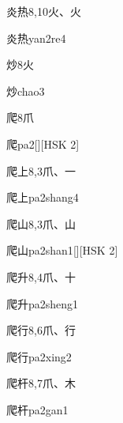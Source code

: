 \begin{entry}{炎热}{8,10}{⽕、⽕}
  \begin{phonetics}{炎热}{yan2re4}
  \end{phonetics}
\end{entry}

\begin{entry}{炒}{8}{⽕}
  \begin{phonetics}{炒}{chao3}
  \end{phonetics}
\end{entry}

\begin{entry}{爬}{8}{⽖}
  \begin{phonetics}{爬}{pa2}[][HSK 2]
  \end{phonetics}
\end{entry}

\begin{entry}{爬上}{8,3}{⽖、⼀}
  \begin{phonetics}{爬上}{pa2shang4}
  \end{phonetics}
\end{entry}

\begin{entry}{爬山}{8,3}{⽖、⼭}
  \begin{phonetics}{爬山}{pa2shan1}[][HSK 2]
  \end{phonetics}
\end{entry}

\begin{entry}{爬升}{8,4}{⽖、⼗}
  \begin{phonetics}{爬升}{pa2sheng1}
  \end{phonetics}
\end{entry}

\begin{entry}{爬行}{8,6}{⽖、⾏}
  \begin{phonetics}{爬行}{pa2xing2}
  \end{phonetics}
\end{entry}

\begin{entry}{爬杆}{8,7}{⽖、⽊}
  \begin{phonetics}{爬杆}{pa2gan1}
  \end{phonetics}
\end{entry}


